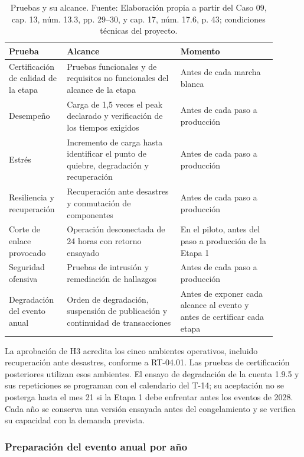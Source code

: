 \documentclass[11pt]{article}
\begin{document}
\begin{longtable}{@{}p{0.176\linewidth}p{0.399\linewidth}p{0.330\linewidth}@{}}
\caption[Pruebas y su alcance]{Pruebas y su alcance. Fuente: Elaboración propia a partir del Caso 09, cap. 13, núm. 13.3, pp. 29–30, y cap. 17, núm. 17.6, p. 43; condiciones técnicas del proyecto.}\label{tab:t18-3}\\
\toprule
\textbf{Prueba} & \textbf{Alcance} & \textbf{Momento} \\
\midrule
\endhead
\bottomrule
\endlastfoot
Certificación de calidad de la etapa & Pruebas funcionales y de requisitos no funcionales del alcance de la etapa & Antes de cada marcha blanca \\
Desempeño & Carga de 1,5 veces el peak declarado y verificación de los tiempos exigidos & Antes de cada paso a producción \\
Estrés & Incremento de carga hasta identificar el punto de quiebre, degradación y recuperación & Antes de cada paso a producción \\
Resiliencia y recuperación & Recuperación ante desastres y conmutación de componentes & Antes de cada paso a producción \\
Corte de enlace provocado & Operación desconectada de 24 horas con retorno ensayado & En el piloto, antes del paso a producción de la Etapa 1 \\
Seguridad ofensiva & Pruebas de intrusión y remediación de hallazgos & Antes de cada paso a producción \\
Degradación del evento anual & Orden de degradación, suspensión de publicación y continuidad de transacciones & Antes de exponer cada alcance al evento y antes de certificar cada etapa \\
\end{longtable}

La aprobación de H3 acredita los cinco ambientes operativos, incluido recuperación ante desastres, conforme a RT-04.01. Las pruebas de certificación posteriores utilizan esos ambientes. El ensayo de degradación de la cuenta 1.9.5 y sus repeticiones se programan con el calendario del T-14; su aceptación no se posterga hasta el mes 21 si la Etapa 1 debe enfrentar antes los eventos de 2028. Cada año se conserva una versión ensayada antes del congelamiento y se verifica su capacidad con la demanda prevista.

\subsubsection*{Preparación del evento anual por año}
\end{document}
